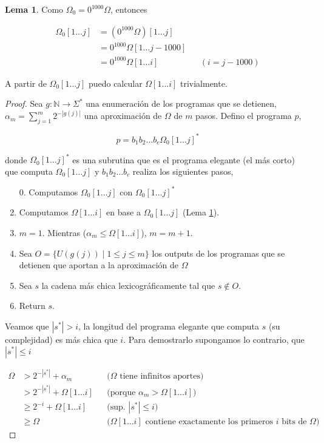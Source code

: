 \documentclass{article}
\theoremstyle{definition} %
\newtheorem{lemma}{Lema}
\newcommand{\first}[2]{#2[1 \dots #1]}
\begin{document}
\begin{lemma}\label{lemma:12.3}
    Como $\Omega_0 = 0^{1000} \Omega$, entonces 
    
    \begin{align*}
        \first{j}{\Omega_0}
        &= \first{j}{(0^{1000} \Omega)} \\
        &= 0^{1000} \first{j - 1000}{\Omega} \\
        &= 0^{1000} \first{i}{\Omega} && (i = j - 1000)
    \end{align*}

    A partir de $\first{j}{\Omega_0}$ puedo calcular $\first{i}{\Omega}$
    trivialmente.
\end{lemma}

\begin{proof}
    Sea $g: \mathbb{N} \to \Sigma^*$ una enumeración de los programas que se
    detienen, $\alpha_m = \sum_{j = 1}^{m} 2 ^ {-|g(j)|}$ una aproximación de
    $\Omega$ de $m$ pasos. Defino el programa $p$,

    \[
        p = b_1 b_2 \dots b_c \first{j}{\Omega_0}^*
    \]

    donde $\first{j}{\Omega_0}^*$ es una subrutina que es el programa elegante
    (el más corto) que computa $\first{j}{\Omega_0}$ y $b_1 b_2 \dots b_c$
    realiza los siguientes pasos,

    \begin{enumerate}
        \item[0.] Computamos $\first{j}{\Omega_0}$ con
        $\first{j}{\Omega_0}^*$
        \item Computamos $\first{i}{\Omega}$ en base a
        $\first{j}{\Omega_0}$ (Lema \ref{lemma:12.3}).
        \item $m = 1$. Mientras ($\alpha_m \leq \first{i}{\Omega}$), $m = m + 1$.
        \item Sea $O = \{ U(g(j)) \mid 1 \leq j \leq m \}$ los outputs de los
        programas que se detienen que aportan a la aproximación de $\Omega$
        \item Sea $s$ la cadena más chica lexicográficamente tal que $s \notin O$.
        \item Return $s$.
    \end{enumerate}

    Veamos que $|s^*| > i$, la longitud del programa elegante que computa $s$
    (su complejidad) es más chica que $i$. Para demostrarlo supongamos lo
    contrario, que $|s^*| \leq i$

    \begin{align*}
        \Omega 
        &> 2^{-|s^*|} + \alpha_m
            &&\text{($\Omega$ tiene infinitos aportes)}\\
        &> 2^{-|s^*|} + \first{i}{\Omega}
            &&\text{(porque $\alpha_m > \first{i}{\Omega}$)}\\
        &\geq 2^{-i} + \first{i}{\Omega}
            &&\text{(sup. $|s^*| \leq i$)}\\
        &\geq \Omega
            &&\text{($\first{i}{\Omega}$ contiene exactamente los primeros $i$ bits de $\Omega$)}
    \end{align*}


\end{proof}
\end{document}
